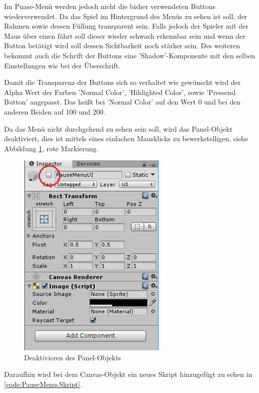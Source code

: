 Im Puase-Menü werden jedoch nicht die bisher verwendeten Buttons wiederverwendet. Da das Spiel im Hintergrund des Menüs zu sehen ist soll, der Rahmen sowie dessen Füllung transparent sein. Falls jedoch der Spieler mit der Maus über einen fährt soll dieser wieder schwach erkennbar sein und wenn der Button betätigt wird soll dessen Sichtbarkeit noch stärker sein. Des weiteren bekommt auch die Schrift der Buttons eine 'Shadow'-Komponente mit den selben Einstellungen wie bei der Überschrift. 

Damit die Transparenz der Buttons sich so verhaltet wie gewünscht wird der Alpha Wert der Farben 'Normal Color', 'Hihlighted Color', sowie 'Pressend Button' angepasst. Das heißt bei 'Normal Color' auf den Wert 0 und bei den anderen Beiden auf 100 und 200. 

Da das Menü nicht durchgehend zu sehen sein soll, wird das Panel-Objekt deaktiviert, dies ist mittels eines einfachen Mausklicks zu bewerkstelligen, siehe Abbildung \ref{deactivatePanel}, rote Markierung.
\begin{figure}[H]
	\includegraphics[height=10cm]{images/deactivatePanel.png}
	\caption{Deaktivieren des Panel-Objekts}
	\label{deactivatePanel}
\end{figure}

Daraufhin wird bei dem Canvas-Objekt ein neues Skript hinzugefügt zu sehen in \cref{code:PauseMenu-Skript}.


